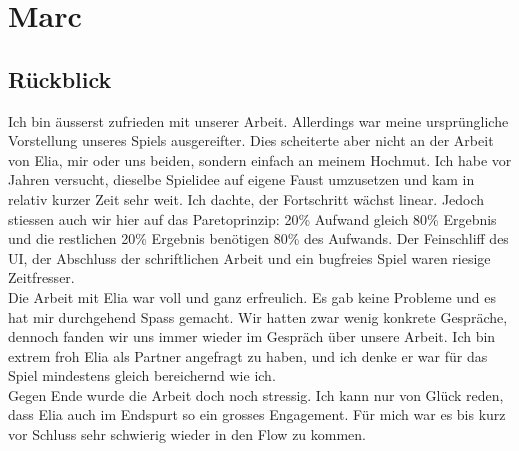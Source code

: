 \chapter{Marc}

\section{Rückblick}
Ich bin äusserst zufrieden mit unserer Arbeit.
Allerdings war meine ursprüngliche Vorstellung unseres Spiels ausgereifter.
Dies scheiterte aber nicht an der Arbeit von Elia, mir oder uns beiden, sondern einfach an meinem Hochmut.
Ich habe vor Jahren versucht, dieselbe Spielidee auf eigene Faust umzusetzen und kam in relativ kurzer Zeit sehr weit.
Ich dachte, der Fortschritt wächst linear.
Jedoch stiessen auch wir hier auf das Paretoprinzip: 20\% Aufwand gleich 80\% Ergebnis und die restlichen 20\% Ergebnis benötigen 80\% des Aufwands.
Der Feinschliff des UI, der Abschluss der schriftlichen Arbeit und ein bugfreies Spiel waren riesige Zeitfresser. \\
Die Arbeit mit Elia war voll und ganz erfreulich.
Es gab keine Probleme und es hat mir durchgehend Spass gemacht.
Wir hatten zwar wenig konkrete Gespräche, dennoch fanden wir uns immer wieder im Gespräch über unsere Arbeit.
Ich bin extrem froh Elia als Partner angefragt zu haben, und ich denke er war für das Spiel mindestens gleich bereichernd wie ich. \\
Gegen Ende wurde die Arbeit doch noch stressig.
Ich kann nur von Glück reden, dass Elia auch im Endspurt so ein grosses Engagement.
Für mich war es bis kurz vor Schluss sehr schwierig wieder in den Flow zu kommen.

